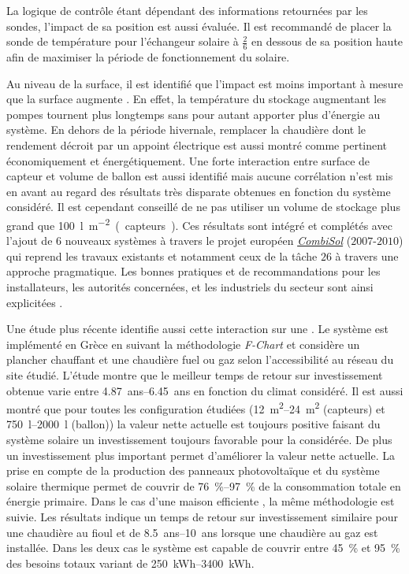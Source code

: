 La logique de contrôle étant dépendant des informations retournées par les sondes,
l’impact de sa position est aussi évaluée. Il est recommandé de placer la sonde
de température pour l’échangeur solaire à $\frac{2}{6}$ en dessous de sa position haute
afin de maximiser la période de fonctionnement du solaire.

Au niveau de la surface, il est identifié que l’impact est moins important à mesure
que la surface augmente \parencite{Task26C2007}. En effet, la température du stockage augmentant les pompes
tournent plus longtemps sans pour autant apporter plus d’énergie au système. En dehors
de la période hivernale, remplacer la chaudière dont le rendement décroit par un appoint
électrique est aussi montré comme pertinent économiquement et énergétiquement.
Une forte interaction entre surface de capteur et volume de ballon est aussi identifié
mais aucune corrélation n’est mis en avant au regard des résultats très disparate
obtenues en fonction du système considéré. Il est cependant conseillé de ne pas utiliser
un volume de stockage plus grand que \SI{100}{\litre\per\metre\squared (capteurs)}.
Ces résultats sont intégré et complétés avec l’ajout de $6$ nouveaux systèmes à travers
le projet européen \href{http://www.combisol.eu/}{\textit{CombiSol}} ($2007$-$2010$) qui reprend
les travaux existants et notamment ceux de la tâche $26$ à travers une approche pragmatique.
Les bonnes pratiques et de recommandations pour les installateurs, les autorités concernées,
et les industriels du secteur sont ainsi explicitées \parencite{Thuer2011}.

Une étude plus récente \textcite{Tsalikis2015743} identifie aussi cette interaction
sur une . Le système est implémenté en Grèce en suivant
la méthodologie \textit{F-Chart} et considère un plancher chauffant et une chaudière
fuel ou gaz selon l’accessibilité au réseau du site étudié.
L’étude montre que le meilleur temps de retour sur investissement obtenue varie entre
\SIrange{4.87}{6.45}{ans} en fonction du climat considéré. Il est aussi montré que pour toutes les
configuration étudiées (\SIrange{12}{24}{\metre\squared} (capteurs) et \SIrange{750}{2000}{\litre} (ballon))
la valeur nette actuelle est toujours positive faisant du système solaire un investissement toujours favorable
pour la  considérée. De plus un investissement plus important
permet d’améliorer la valeur nette actuelle. La prise en compte de la production
des panneaux photovoltaïque et du système solaire thermique permet de couvrir de
\SIrange{76}{97}{\percent} de la consommation totale en énergie primaire.
Dans le cas d’une maison efficiente \parencite{Martinopoulos2014130}, la même méthodologie
est suivie. Les résultats indique un temps de retour sur investissement similaire pour
une chaudière au fioul et de \SIrange{8.5}{10}{ans} lorsque une chaudière au gaz
est installée.
Dans les deux cas le système est capable de couvrir entre \SI{45}{\percent} et \SI{95}{\percent}
des besoins totaux variant de \SIrange{250}{3400}{kWh}.




